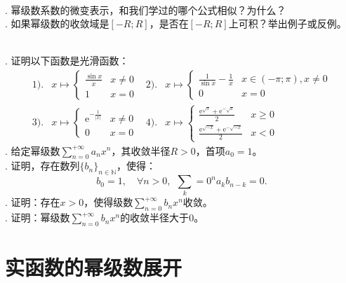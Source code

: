 \documentclass[12pt,UTF8]{ctexbook}
\begin{document}
\begin{appendix}
\begin{sk}
    \mbox{} \\
    . 幂级数系数的微变表示，和我们学过的哪个公式相似？为什么？\\
    . 如果幂级数的收敛域是$[-R;R]$，是否在$[-R;R]$上可积？举出例子或反例。
\end{sk}

\begin{xt}
    \mbox{} \\
    . 证明以下函数是光滑函数：
    \begin{align*}
        1).& 
        x \mapsto \begin{cases}
            \frac{\sin{x}}{x} & x\neq 0 \\
            1 & x = 0 
        \end{cases}
        &2).&
        x \mapsto \begin{cases}
            \frac{1}{\sin{x}} - \frac{1}{x} & x\in (-\pi;\pi), x\neq 0 \\
            0 & x = 0 
        \end{cases} \\
        3).& 
        x \mapsto \begin{cases}
            \mathrm{e}^{-\frac{1}{|x|}} & x\neq 0 \\
            0 & x = 0 
        \end{cases}
        &4).&
        x \mapsto \begin{cases}
            \frac{\mathrm{e}^{\sqrt{x}} + \mathrm{e}^{-\sqrt{x}}}{2} & x\geqslant 0 \\
            \frac{\mathrm{e}^{\sqrt{-x}} + \mathrm{e}^{-\sqrt{-x}}}{2} & x < 0 
        \end{cases}
    \end{align*}
    . 给定幂级数$\sum_{n=0}^{+\infty} a_n x^n$，其收敛半径$R>0$，首项$a_0=1$。\\
    . 证明，存在数列$\{b_n\}_{n\in\mathbb{N}}$，使得：
    $$
    b_0 = 1, \quad \forall n > 0, \;\, \sum_k=0^n a_k b_{n-k} = 0.
    $$
    . 证明：存在$x>0$，使得级数$\sum_{n=0}^{+\infty} b_n x^n$收敛。\\
    . 证明：幂级数$\sum_{n=0}^{+\infty} b_n x^n$的收敛半径大于$0$。
\end{xt}

\section{实函数的幂级数展开}


\end{appendix}
\end{document}
